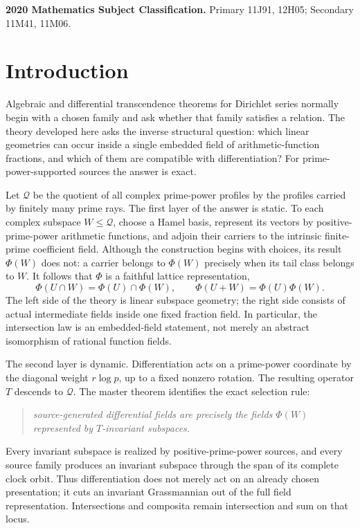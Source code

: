 \documentclass[11pt]{article}
\theoremstyle{definition}
\theoremstyle{remark}
\newcommand{\cQ}{\mathcal Q}
\begin{document}
\medskip
\noindent\textbf{2020 Mathematics Subject Classification.}
Primary 11J91, 12H05; Secondary 11M41, 11M06.

\section{Introduction}

Algebraic and differential transcendence theorems for Dirichlet series normally begin with a
chosen family and ask whether that family satisfies a relation.  The theory developed here asks
the inverse structural question: which linear geometries can occur inside a single embedded
field of arithmetic-function fractions, and which of them are compatible with differentiation?
For prime-power-supported sources the answer is exact.

Let \(\cQ\) be the quotient of all complex prime-power profiles by the profiles carried by
finitely many prime rays.  The first layer of the answer is static.  To each complex subspace
\(W\leq\cQ\), choose a Hamel basis, represent its vectors by positive-prime-power arithmetic
functions, and adjoin their carriers to the intrinsic finite-prime coefficient field.  Although
the construction begins with choices, its result \(\Phi(W)\) does not: a carrier belongs to
\(\Phi(W)\) precisely when its tail class belongs to \(W\).  It follows that \(\Phi\) is a
faithful lattice representation,
\begin{equation}\label{eq:lattice-intro}
 \Phi(U\cap W)=\Phi(U)\cap\Phi(W),\qquad
 \Phi(U+W)=\Phi(U)\Phi(W).
\end{equation}
The left side of the theory is linear subspace geometry; the right side consists of actual
intermediate fields inside one fixed fraction field.  In particular, the intersection law is an
embedded-field statement, not merely an abstract isomorphism of rational function fields.

The second layer is dynamic.  Differentiation acts on a prime-power coordinate by the diagonal
weight \(r\log p\), up to a fixed nonzero rotation.  The resulting operator \(T\) descends to
\(\cQ\).  The master theorem identifies the exact selection rule:
\begin{quote}
\emph{source-generated differential fields are precisely the fields \(\Phi(W)\) represented by
\(T\)-invariant subspaces.}
\end{quote}
Every invariant subspace is realized by positive-prime-power sources, and every source family
produces an invariant subspace through the span of its complete clock orbit.  Thus
differentiation does not merely act on an already chosen presentation; it cuts an invariant
Grassmannian out of the full field representation.  Intersections and composita remain
intersection and sum on that locus.
\end{document}
